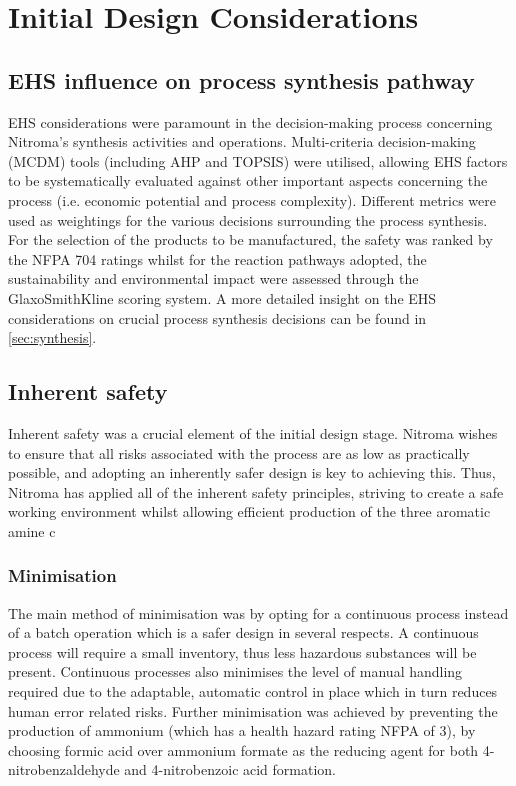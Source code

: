  
\section{Initial Design Considerations}

\subsection{EHS influence on process synthesis pathway}

EHS considerations were paramount in the decision-making process concerning Nitroma’s synthesis activities and operations. Multi-criteria decision-making (MCDM) tools (including AHP and TOPSIS) were utilised, allowing EHS factors to be systematically evaluated against other important aspects concerning the process (i.e. economic potential and process complexity). Different metrics were used as weightings for the various decisions surrounding the process synthesis. For the selection of the products to be manufactured, the safety was ranked by the NFPA 704 ratings whilst for the reaction pathways adopted, the sustainability and environmental impact were assessed through the GlaxoSmithKline scoring system. A more detailed insight on the EHS considerations on crucial process synthesis decisions can be found in \cref{sec:synthesis}. 

\subsection{Inherent safety}
\label{sec:inherentsafety}

Inherent safety was a crucial element of the initial design stage. Nitroma wishes to ensure that all risks associated with the process are as low as practically possible, and adopting an inherently safer design is key to achieving this. Thus, Nitroma has applied all of the inherent safety principles, striving to create a safe working environment whilst allowing efficient production of the three aromatic amine c

\subsubsection{Minimisation}
The main method of minimisation was by opting for a continuous process instead of a batch operation which is a safer design in several respects. A continuous process will require a small inventory, thus less hazardous substances will be present. Continuous processes also minimises the level of manual handling required due to the adaptable, automatic control in place which in turn reduces human error related risks. 
Further minimisation was achieved by preventing the production of ammonium (which has a health hazard rating NFPA of 3), by choosing formic acid over ammonium formate as the reducing agent for both 4-nitrobenzaldehyde and 4-nitrobenzoic acid formation. 



